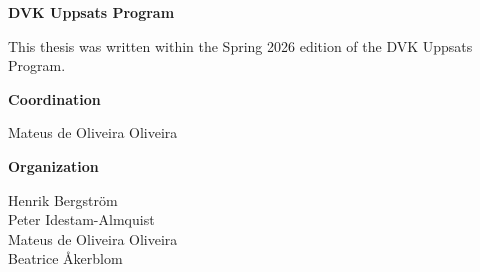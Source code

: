 \thispagestyle{empty}
\noindent\textbf{DVK Uppsats Program}

\noindent This thesis was written within the Spring 2026 edition of the DVK
Uppsats Program.

\medskip
\noindent\textbf{Coordination}

\noindent Mateus de Oliveira Oliveira

\medskip
\noindent\textbf{Organization}

\noindent Henrik Bergström\\
Peter Idestam-Almquist\\
Mateus de Oliveira Oliveira\\
Beatrice Åkerblom

\clearpage
\thispagestyle{empty}
\mbox{}



